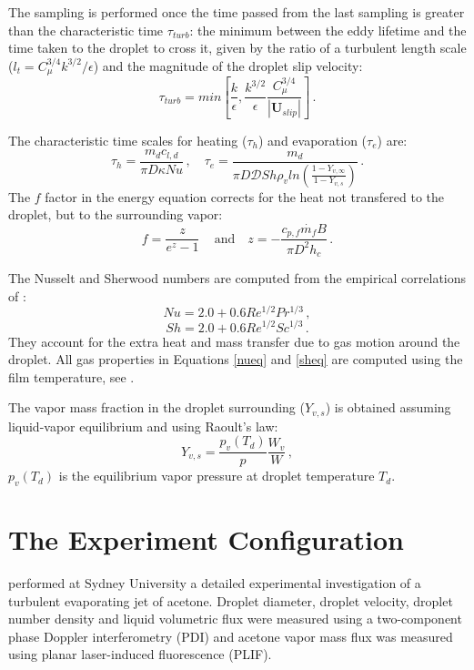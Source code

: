 \documentclass[preprint,12pt,review]{elsarticle}
\newcommand{\bv}[1]{\mathbf{#1}}
\begin{document}
The sampling is performed once the time passed from the last sampling is greater than the characteristic time $\tau_{turb}$: the minimum between the eddy lifetime and the time taken to the droplet to cross it, given by the ratio of a turbulent length scale ($l_t = C_{\mu}^{3/4} k^{3/2} / \epsilon $) and the magnitude of the droplet slip velocity:
\begin{equation}
 \tau_{turb} = min \left[ \frac{k}{\epsilon} , \frac{k^{3/2}}{\epsilon} \frac{C_{\mu}^{3/4}}{|\bv{U}_{slip}|}\right] \, .
\end{equation}

The characteristic time scales for heating ($\tau_h$) and evaporation ($\tau_e$) are:
\begin{equation}
 \tau_h=\frac{m_d c_{l,d}}{\pi D \kappa Nu} \, , \quad  \tau_e = \frac{m_d}{\pi D \mathcal{D} Sh \rho_v ln\left(\frac{1-Y_{v,\infty}}{1-Y_{v,s}} \right)} \, .
\end{equation}
The $f$ factor in the energy equation corrects for the heat not transfered to the droplet, but to the surrounding vapor:
\begin{equation}
f =  \frac{z}{e^z-1} \,  \quad \text{and} \quad z= - \frac{c_{p,f} \dot{m_f} B}{ \pi D^2 h_c} \, .
\end{equation}

The Nusselt and Sherwood numbers are computed from the empirical correlations of \citet{ranzmarshall}:
\begin{equation}\label{nueq}
 Nu= 2.0 +0.6 Re^{1/2} Pr^{1/3} \, ,
\end{equation}
\begin{equation}\label{sheq}
 Sh = 2.0 +0.6 Re^{1/2} Sc^{1/3} \, .
\end{equation}
They account for the extra heat and mass transfer due to gas motion around the droplet. All gas properties in Equations \eqref{nueq} and \eqref{sheq} are computed using the film temperature, see \citet{naca}.

The vapor mass fraction in the droplet surrounding ($Y_{v,s}$) is obtained assuming liquid-vapor equilibrium and using Raoult's law:
\begin{equation}
Y_{v,s} = \frac{p_v \left(T_d\right)}{p}\frac{W_v}{W} \, ,
\end{equation}
$p_v \left(T_d\right)$ is the equilibrium vapor pressure at droplet temperature $T_d$.

\section{The Experiment Configuration}
\label{experiment}
\citet{chen} performed at Sydney University a detailed experimental investigation of a turbulent evaporating jet of acetone. Droplet diameter, droplet velocity, droplet number density and liquid volumetric flux were measured using a two-component phase Doppler interferometry (PDI) and acetone vapor mass flux was measured using planar laser-induced fluorescence (PLIF).
\end{document}
